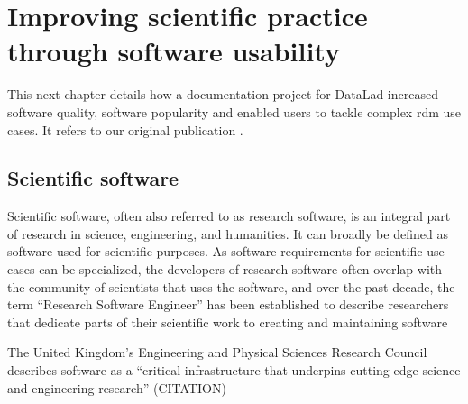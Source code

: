 

\chapter{Improving scientific practice through software usability}
\label{chap:k2}




This next chapter details how a documentation project for DataLad increased software quality, software popularity and enabled users to tackle complex \gls{rdm} use cases.
It refers to our original publication \citep{wagner2020datalad}.


\section{Scientific software}

Scientific software, often also referred to as research software, is an integral part of research in science, engineering, and humanities.
It can broadly be defined as software used for scientific purposes.
As software requirements for scientific use cases can be specialized, the developers of research software often overlap with the community of scientists that uses the software, and over the past decade, the term ``Research Software Engineer'' has been established to describe researchers that dedicate parts of their scientific work to creating and maintaining software \citep{hettrickRSE}



The United Kingdom's Engineering and Physical Sciences Research Council describes software as a ``critical infrastructure that underpins cutting edge science and engineering research'' (CITATION) %

